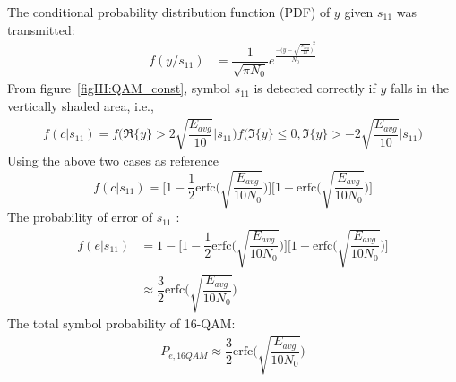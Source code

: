 		
				The conditional probability distribution function (PDF) of $ y $ given $ s_{11} $ was transmitted:
				\begin{align}
				f(y/s_{11})&=\dfrac{1}{\sqrt{\pi N_0}}e^{\frac{{-\big ( y-\sqrt{\frac{E_{avg}}{10}}\big )}^2}{N_0}}
				\end{align}
				From figure~\ref{figIII:QAM_const}, symbol $ s_{11} $ is detected correctly if $ y $ falls in the vertically shaded area, i.e.,
				\begin{align*}
				f(c|s_{11})=f \Bigg(\Re\{y\}>2\sqrt{\dfrac{E_{avg}}{10}} \Big|s_{11} \Bigg )f\Bigg (\Im\{y\}\leq 0,\Im\{y\}> -2\sqrt{\dfrac{E_{avg}}{10}} \Big| s_{11} \Bigg )
				\end{align*}
				Using the above two cases as reference
				\begin{equation}
				f(c|s_{11})=\Bigg[ 1-\dfrac{1}{2}\text{erfc}\Bigg( \sqrt{\dfrac{E_{avg}}{10N_0}} \Bigg)\Bigg]\Bigg[ 1-\text{erfc}\Bigg( \sqrt{\dfrac{E_{avg}}{10N_0}} \Bigg)\Bigg]
				\end{equation}
				The probability of error of $ s_{11} $ :
				\begin{align}
				f(e|s_{11})&=1-\Bigg[ 1-\dfrac{1}{2}\text{erfc}\Bigg( \sqrt{\dfrac{E_{avg}}{10N_0}} \Bigg)\Bigg]\Bigg[ 1-\text{erfc}\Bigg( \sqrt{\dfrac{E_{avg}}{10N_0}} \Bigg)\Bigg]\\
				&\approx \dfrac{3}{2}\text{erfc}\Bigg( \sqrt{\dfrac{E_{avg}}{10N_0}} \Bigg)
				\end{align}
				The total symbol probability of 16-QAM:
				  \begin{align}
				  P_{e,16QAM}\approx \dfrac{3}{2}\text{erfc}\Bigg( \sqrt{\dfrac{E_{avg}}{10N_0}} \Bigg)				
				\end{align}

